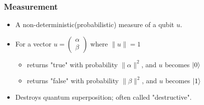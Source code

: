 \documentclass{beamer}
\begin{document}
    \begin{frame}
        \frametitle{Measurement}
        \begin{itemize}
            \item A non-deterministic(probabilistic) measure of a qubit $u$.
            \item For a vector $u=\begin{pmatrix} \alpha \\ \beta \end{pmatrix}$ where $\|u\|=1$
            \begin{itemize}
                \item returns "true" with probability $\|\alpha\|^2$, and $u$ becomes $\ket{0}$
                \item returns "false" with probability $\|\beta\|^2$, and $u$ becomes $\ket{1}$
            \end{itemize}
            \item Destroys quantum superposition; often called "destructive".
        \end{itemize}
    \end{frame}
\end{document}
